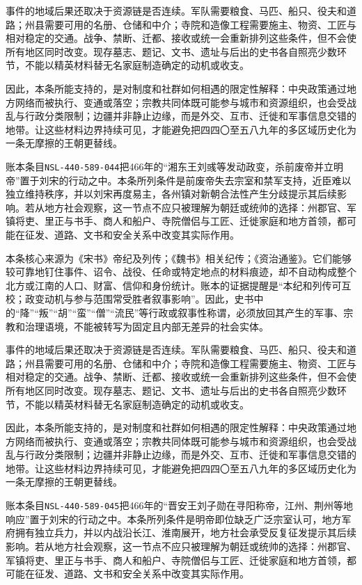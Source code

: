 事件的地域后果还取决于资源链是否连续。军队需要粮食、马匹、船只、役夫和道路；州县需要可用的名册、仓储和中介；寺院和造像工程需要施主、物资、工匠与相对稳定的交通。战争、禁断、迁都、接收或统一会重新排列这些条件，但不会使所有地区同时改变。现存墓志、题记、文书、遗址与后出的史书各自照亮少数环节，不能以精英材料替无名家庭制造确定的动机或收支。

因此，本条所能支持的，是对制度和社群如何相遇的限定性解释：中央政策通过地方网络而被执行、变通或落空；宗教共同体既可能参与城市和资源组织，也会受战乱与行政分类限制；边疆并非静止边缘，而是外交、互市、迁徙和军事信息交错的地带。让这些材料边界持续可见，才能避免把四四〇至五八九年的多区域历史化为一条无摩擦的王朝更替线。

账本条目\texttt{NSL-440-589-044}把466年的“湘东王刘彧等发动政变，杀前废帝并立明帝”置于刘宋的行动之中。本条所列条件是前废帝失去宗室和禁军支持，近臣难以独立维持秩序，并以刘宋再度易主，各州镇对新朝合法性产生分歧提示其后续影响。若从地方社会观察，这一节点不应只被理解为朝廷或统帅的选择：州郡官、军镇将吏、里正与书手、商人和船户、寺院僧侣与工匠、迁徙家庭和地方首领，都可能在征发、道路、文书和安全关系中改变其实际作用。

本条核心来源为《宋书》帝纪及列传；《魏书》相关纪传；《资治通鉴》。它们能够较可靠地钉住事件、诏令、战役、任命或特定地点的材料痕迹，却不自动构成整个北方或江南的人口、财富、信仰和身份统计。账本的证据提醒是“本纪和列传可互校；政变动机与参与范围常受胜者叙事影响”。因此，史书中的“降”“叛”“胡”“蛮”“僧”“流民”等行政或叙事性称谓，必须放回其产生的军事、宗教和治理语境，不能被转写为固定且内部无差异的社会实体。

事件的地域后果还取决于资源链是否连续。军队需要粮食、马匹、船只、役夫和道路；州县需要可用的名册、仓储和中介；寺院和造像工程需要施主、物资、工匠与相对稳定的交通。战争、禁断、迁都、接收或统一会重新排列这些条件，但不会使所有地区同时改变。现存墓志、题记、文书、遗址与后出的史书各自照亮少数环节，不能以精英材料替无名家庭制造确定的动机或收支。

因此，本条所能支持的，是对制度和社群如何相遇的限定性解释：中央政策通过地方网络而被执行、变通或落空；宗教共同体既可能参与城市和资源组织，也会受战乱与行政分类限制；边疆并非静止边缘，而是外交、互市、迁徙和军事信息交错的地带。让这些材料边界持续可见，才能避免把四四〇至五八九年的多区域历史化为一条无摩擦的王朝更替线。

账本条目\texttt{NSL-440-589-045}把466年的“晋安王刘子勋在寻阳称帝，江州、荆州等地响应”置于刘宋的行动之中。本条所列条件是明帝即位缺乏广泛宗室认可，地方军府拥有独立兵力，并以内战沿长江、淮南展开，地方社会承受反复征发提示其后续影响。若从地方社会观察，这一节点不应只被理解为朝廷或统帅的选择：州郡官、军镇将吏、里正与书手、商人和船户、寺院僧侣与工匠、迁徙家庭和地方首领，都可能在征发、道路、文书和安全关系中改变其实际作用。

